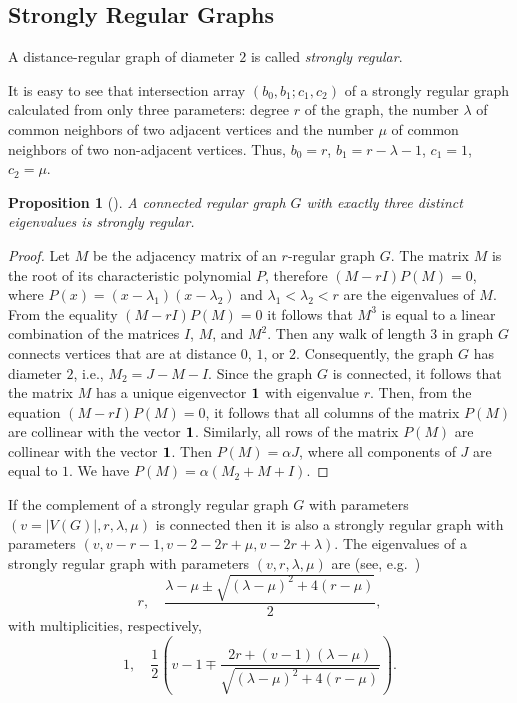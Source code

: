 \documentclass[11pt]{article}
\newtheorem{claim}{Proposition}[section]
\theoremstyle{definition}
\begin{document}
\subsection{Strongly Regular Graphs}


A distance-regular graph of diameter $2$ is called {\sl strongly
regular}.

It is easy to see that intersection array $(b_0,b_1; c_1,c_2)$ of  a strongly regular graph calculated from only three parameters: degree $r$ of the graph, the number $\lambda$ of common neighbors of two adjacent vertices and the number $\mu$ of common neighbors of two non-adjacent vertices. Thus, $b_0=r$, $b_1=r-\lambda-1$, $c_1=1$, $c_2=\mu$.


{
\begin{claim}[\cite{GodsilR}] A connected regular graph $G$ with exactly three distinct
eigenvalues is strongly regular.
\end{claim}
\begin{proof}
Let $M$ be the adjacency matrix of an $r$-regular graph $G$. The matrix $M$
is the root of its characteristic polynomial $P$, therefore
$(M-rI)P(M)=0$, where $P(x)=(x-\lambda_1)(x-\lambda_2)$ and
$\lambda_1<\lambda_2<r$ are the eigenvalues of $M$. From
the equality $(M-rI)P(M)=0$ it follows that  $M^3$ is equal to a linear
combination of the matrices $I$, $M$, and $M^2$. Then any walk of length $3$ in
graph $G$ connects vertices that are at distance $0$, $1$, or
$2$. Consequently, the graph $G$ has diameter $2$, i.e.,  $M_2=J-M-I$. Since the graph
$G$ is connected, it follows that the matrix $M$ has a unique eigenvector
${\bf 1}$ with eigenvalue $r$. Then, from the equation
$(M-rI)P(M)=0$, it follows that all columns of the matrix $P(M)$ are collinear
with the vector ${\bf 1}$. Similarly, all rows of the matrix $P(M)$ are collinear
with the vector ${\bf 1}$. Then $P(M)=\alpha J$, where all components of 
$J$ are equal to $1$. We have  $P(M)=\alpha(M_2+M+I)$.
\end{proof}
}


If the complement of a strongly regular graph $G$ with parameters $(v=|V(G)|, r, \lambda, \mu)$ is connected then it is
also a strongly regular graph with parameters $(v,v-r-1,v-2-2r+\mu, v-2r+\lambda)$.
The eigenvalues of a strongly regular graph with parameters $(v, r, \lambda, \mu)$ are 
(see, e.g.~{\cite[Theorem\,9.1.3]{BHaemers}})
$$
 r, \quad \frac{\lambda-\mu \pm \sqrt{(\lambda-\mu)^2+4(r-\mu)}}2,
$$
with multiplicities, respectively,
$$
 1, \quad \frac12
 \left(
 {v-1 \mp \frac{2r+(v-1)(\lambda-\mu)}{\sqrt{(\lambda-\mu)^2+4(r-\mu)}} }
 \right).
$$
\end{document}
